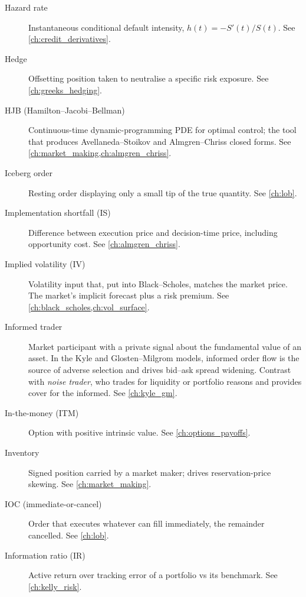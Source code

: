 \begin{description}
\item[Hazard rate]
Instantaneous conditional default intensity, $h(t) = -S'(t)/S(t)$. See \cref{ch:credit_derivatives}.

\item[Hedge]
Offsetting position taken to neutralise a specific risk exposure. See \cref{ch:greeks_hedging}.

\item[HJB (Hamilton--Jacobi--Bellman)]
Continuous-time dynamic-programming PDE for optimal control; the tool
that produces Avellaneda--Stoikov and Almgren--Chriss closed forms. See \cref{ch:market_making,ch:almgren_chriss}.

\item[Iceberg order]
Resting order displaying only a small tip of the true quantity. See \cref{ch:lob}.

\item[Implementation shortfall (IS)]
Difference between execution price and decision-time price, including
opportunity cost. See \cref{ch:almgren_chriss}.

\item[Implied volatility (IV)]
Volatility input that, put into Black--Scholes, matches the market
price. The market's implicit forecast plus a risk premium. See \cref{ch:black_scholes,ch:vol_surface}.

\item[Informed trader]
Market participant with a private signal about the fundamental value of
an asset. In the Kyle and Glosten--Milgrom models, informed order flow
is the source of adverse selection and drives bid--ask spread widening.
Contrast with \emph{noise trader}, who trades for liquidity or
portfolio reasons and provides cover for the informed.
See \cref{ch:kyle_gm}.

\item[In-the-money (ITM)]
Option with positive intrinsic value. See \cref{ch:options_payoffs}.

\item[Inventory]
Signed position carried by a market maker; drives reservation-price
skewing. See \cref{ch:market_making}.

\item[IOC (immediate-or-cancel)]
Order that executes whatever can fill immediately, the remainder
cancelled. See \cref{ch:lob}.

\item[Information ratio (IR)]
Active return over tracking error of a portfolio vs its benchmark. See \cref{ch:kelly_risk}.


\end{description}
